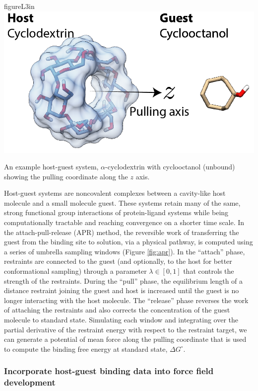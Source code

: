 \documentclass[11pt,notitlepage]{article}
\begin{document}
\begin{wrapfloat}{figure}{L}{3in}
\centering
\includegraphics{content/images/APR-annotated.png}
\caption{An example host-guest system, \(\alpha\)-cyclodextrin with
cyclooctanol (unbound) showing the pulling coordinate along the \(z\)
axis.}
\label{fig:apr}
\end{wrapfloat}

Host-guest systems are noncovalent complexes between a cavity-like host
molecule and a small molecule guest. These systems retain many of the
same, strong functional group interactions of protein-ligand systems
while being computationally tractable and reaching convergence on a
shorter time scale. In the attach-pull-release (APR) method, the
reversible work of transferring the guest from the binding site to
solution, via a physical pathway, is computed using a series of umbrella
sampling windows (Figure \ref{fig:apr}). In the ``attach'' phase,
restraints are connected to the guest (and optionally, to the host for
better conformational sampling) through a parameter
\(\lambda \in [0, 1]\) that controls the strength of the restraints.
During the ``pull'' phase, the equilibrium length of a distance
restraint joining the guest and host is increased until the guest is no
longer interacting with the host molecule. The ``release'' phase
reverses the work of attaching the restraints and also corrects the
concentration of the guest molecule to standard state. Simulating each
window and integrating over the partial derivative of the restraint
energy with respect to the restraint target, we can generate a potential
of mean force along the pulling coordinate that is used to compute the
binding free energy at standard state, \(\Delta G^\circ\).

\hypertarget{incorporate-host-guest-binding-data-into-force-field-development}{%
\subsubsection{Incorporate host-guest binding data into force field
development}\label{incorporate-host-guest-binding-data-into-force-field-development}}
\end{document}
